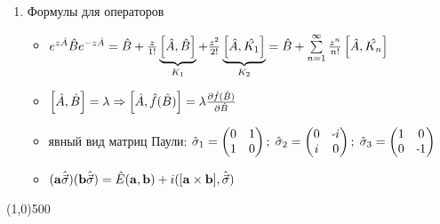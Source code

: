 \begin{enumerate}[label=\textbf{\underline{\arabic*.}}]
\begin{itemize}
        \end{itemize}
\item Формулы для операторов  \begin{itemize}
            \item
            $ e^{z\hat{A}}\hat{B}e^{-z\hat{A}} = \hat{B} + \frac{z}{1!}\underbrace{\left[ \hat{A}, \hat{B} \right]}_{K_1} + \frac{z^2}{2!}\underbrace{\left[ \hat{A}, \hat{K_1} \right]}_{K_2} = \hat{B}+\sum\limits_{n=1}^{\infty}\frac{z^n}{n!}\left[ \hat{A}, \hat{K_n} \right] $
            \item
            $ \left[ \hat{A}, \hat{B} \right]=\lambda \Rightarrow \left[ \hat{A}, \hat{f}(\hat{B}) \right]=\lambda \frac{\partial \hat{f}(\hat{B})}{\partial \hat{B}} $
            \item явный вид матриц Паули:
            $ \hat{\sigma}_1=\begin{pmatrix} 0&1\\1&0 \end{pmatrix};\; \hat{\sigma}_2=\begin{pmatrix} 0&\scalebox{0.75}[1.0]{-}i\\i&0 \end{pmatrix};\; \hat{\sigma}_3=\begin{pmatrix} 1&0\\0&\scalebox{0.75}[1.0]{-}1 \end{pmatrix} $
            \item
            $ (\mathbf{a}\hat{\vec{\sigma}})(\mathbf{b}\hat{\vec{\sigma}}) = \hat{E}(\mathbf{a},\mathbf{b}) + i([\mathbf{a}\times\mathbf{b}],\hat{\vec{\sigma}}) $
        \end{itemize}
\end{enumerate}
\vfill\line(1,0){500}

